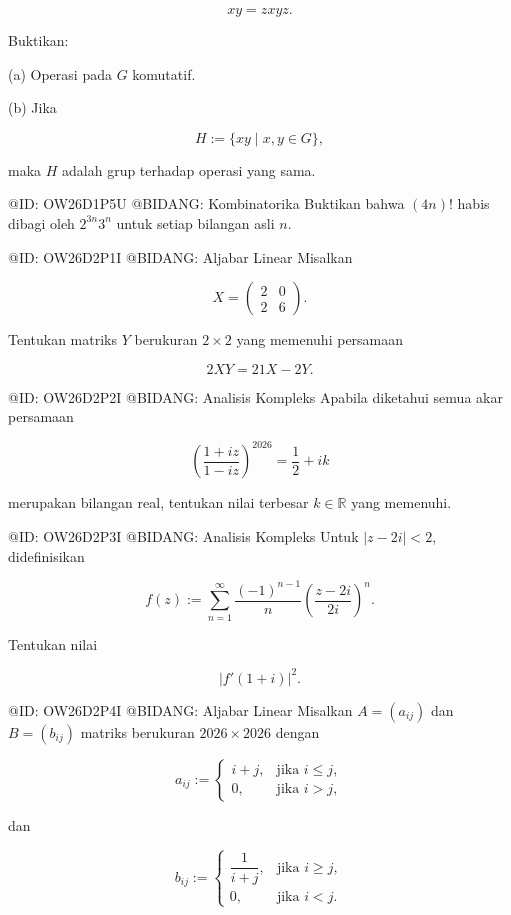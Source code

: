 $$
xy=zxyz.
$$

Buktikan:

(a) Operasi pada $G$ komutatif.

(b) Jika

$$
H:=\{xy\mid x,y\in G\},
$$

maka $H$ adalah grup terhadap operasi yang sama.

@ID: OW26D1P5U
@BIDANG: Kombinatorika
Buktikan bahwa $(4n)!$ habis dibagi oleh $2^{3n}3^n$ untuk setiap bilangan asli $n$.













@ID: OW26D2P1I
@BIDANG: Aljabar Linear
Misalkan

$$
X=
\begin{pmatrix}
2&0\\
2&6
\end{pmatrix}.
$$

Tentukan matriks $Y$ berukuran $2\times2$ yang memenuhi persamaan

$$
2XY=21X-2Y.
$$

@ID: OW26D2P2I
@BIDANG: Analisis Kompleks
Apabila diketahui semua akar persamaan

$$
\left(\frac{1+iz}{1-iz}\right)^{2026}
=
\frac12+ik
$$

merupakan bilangan real, tentukan nilai terbesar $k\in\mathbb{R}$ yang memenuhi.

@ID: OW26D2P3I
@BIDANG: Analisis Kompleks
Untuk $|z-2i|<2$, didefinisikan

$$
f(z):=
\sum_{n=1}^{\infty}
\frac{(-1)^{n-1}}{n}
\left(\frac{z-2i}{2i}\right)^n.
$$

Tentukan nilai

$$
|f'(1+i)|^2.
$$

@ID: OW26D2P4I
@BIDANG: Aljabar Linear
Misalkan $A=(a_{ij})$ dan $B=(b_{ij})$ matriks berukuran $2026\times2026$ dengan

$$
a_{ij}:=
\begin{cases}
i+j,&\text{jika } i\le j,\\
0,&\text{jika } i>j,
\end{cases}
$$

dan

$$
b_{ij}:=
\begin{cases}
\dfrac{1}{i+j},&\text{jika } i\ge j,\\
0,&\text{jika } i<j.
\end{cases}
$$

